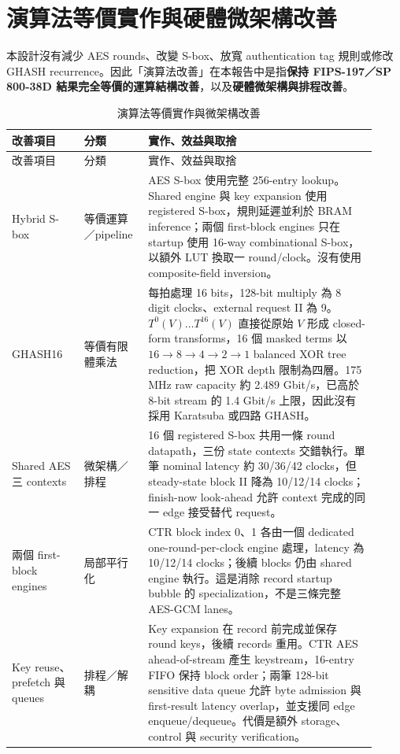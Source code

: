 \documentclass[UTF8,fontset=none,11pt,a4paper]{ctexrep}
\begin{document}
\section{演算法等價實作與硬體微架構改善}

本設計沒有減少 AES rounds、改變 S-box、放寬 authentication tag 規則或修改 GHASH recurrence。因此「演算法改善」在本報告中是指\textbf{保持 FIPS-197／SP 800-38D 結果完全等價的運算結構改善}，以及\textbf{硬體微架構與排程改善}。

\begingroup
\small
\begin{longtable}{p{0.18\linewidth}p{0.16\linewidth}p{0.58\linewidth}}
\caption{演算法等價實作與微架構改善}\label{tab:algorithm-microarchitecture-improvements}\\
\toprule
改善項目 & 分類 & 實作、效益與取捨 \\
\midrule
\endfirsthead
\toprule
改善項目 & 分類 & 實作、效益與取捨 \\
\midrule
\endhead
Hybrid S-box & 等價運算／pipeline & AES S-box 使用完整 256-entry lookup。Shared engine 與 key expansion 使用 registered S-box，規則延遲並利於 BRAM inference；兩個 first-block engines 只在 startup 使用 16-way combinational S-box，以額外 LUT 換取一 round/clock。沒有使用 composite-field inversion。 \\
\addlinespace
GHASH16 & 等價有限體乘法 & 每拍處理 16 bits，128-bit multiply 為 8 digit clocks、external request II 為 9。$T^0(V)\ldots T^{16}(V)$ 直接從原始 $V$ 形成 closed-form transforms，16 個 masked terms 以 $16\rightarrow8\rightarrow4\rightarrow2\rightarrow1$ balanced XOR tree reduction，把 XOR depth 限制為四層。175 MHz raw capacity 約 2.489 Gbit/s，已高於 8-bit stream 的 1.4 Gbit/s 上限，因此沒有採用 Karatsuba 或四路 GHASH。 \\
\addlinespace
Shared AES 三 contexts & 微架構／排程 & 16 個 registered S-box 共用一條 round datapath，三份 state contexts 交錯執行。單筆 nominal latency 約 30/36/42 clocks，但 steady-state block II 降為 10/12/14 clocks；finish-now look-ahead 允許 context 完成的同一 edge 接受替代 request。 \\
\addlinespace
兩個 first-block engines & 局部平行化 & CTR block index 0、1 各由一個 dedicated one-round-per-clock engine 處理，latency 為 10/12/14 clocks；後續 blocks 仍由 shared engine 執行。這是消除 record startup bubble 的 specialization，不是三條完整 AES-GCM lanes。 \\
\addlinespace
Key reuse、prefetch 與 queues & 排程／解耦 & Key expansion 在 record 前完成並保存 round keys，後續 records 重用。CTR AES ahead-of-stream 產生 keystream，16-entry FIFO 保持 block order；兩筆 128-bit sensitive data queue 允許 byte admission 與 first-result latency overlap，並支援同 edge enqueue/dequeue。代價是額外 storage、control 與 security verification。 \\
\bottomrule
\end{longtable}
\endgroup
\end{document}
